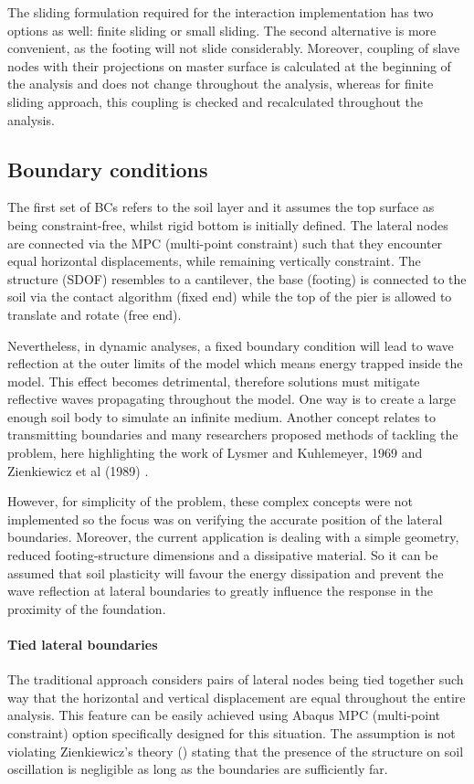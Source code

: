 The sliding formulation required for the interaction implementation has two options as well: finite sliding or small sliding. The second alternative is more convenient, as the footing will not slide considerably. Moreover, coupling of slave nodes with their projections on master surface is calculated at the beginning of the analysis and does not change throughout the analysis, whereas for finite sliding approach, this coupling is checked and recalculated throughout the analysis.

\subsection{Boundary conditions}
The first set of BCs refers to the soil layer and it assumes the top surface as being constraint-free, whilst rigid bottom is initially defined. The lateral nodes are connected via the MPC (multi-point constraint) such that they encounter equal horizontal displacements, while remaining vertically constraint. The structure (SDOF) resembles to a cantilever, the base (footing) is connected to the soil via the contact algorithm (fixed end) while the top of the pier is allowed to translate and rotate (free end).

Nevertheless, in dynamic analyses, a fixed boundary condition will lead to wave reflection at the outer limits of the model which means energy trapped inside the model. This effect becomes detrimental, therefore solutions must mitigate reflective waves propagating throughout the model. One way is to create a large enough soil body to simulate an infinite medium. Another concept relates to transmitting boundaries and many researchers proposed methods of tackling the problem, here highlighting the work of Lysmer and Kuhlemeyer, 1969 \cite{lysmer1969finite} and Zienkiewicz et al (1989) \cite{zienkiewicz1989earthquake}.

However, for simplicity of the problem, these complex concepts were not implemented so the focus was on verifying the accurate position of the lateral boundaries. Moreover, the current application is dealing with a simple geometry, reduced  footing-structure dimensions and a dissipative material. So it can be assumed that soil plasticity will favour the energy dissipation and prevent the wave reflection at lateral boundaries to greatly influence the response in the proximity of the foundation.

 \paragraph{Tied lateral boundaries}
	The traditional approach considers pairs of lateral nodes being tied together such way that the horizontal and vertical displacement are equal throughout the entire analysis. This feature can be easily achieved using Abaqus MPC (multi-point constraint) option specifically designed for this situation. The assumption is not violating Zienkiewicz's theory (\cite{zienkiewicz1989earthquake}) stating that the presence of the structure on soil oscillation is negligible as long as the boundaries are sufficiently far.
	
